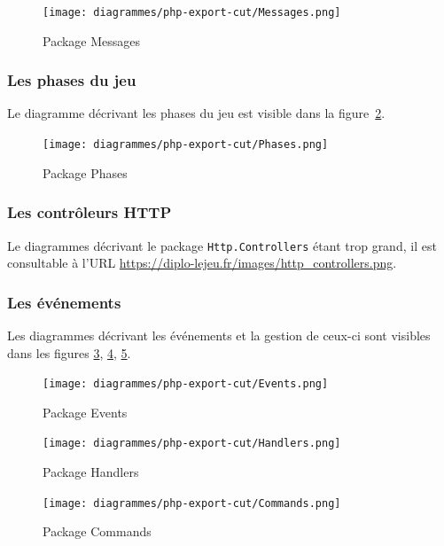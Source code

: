 			\begin{figure}[h!]
				\centering
                \texttt{[image: diagrammes/php-export-cut/Messages.png]}
                \caption{\label{pmessages}Package Messages}
                \pagebreak
			\end{figure}

        \subsubsection{Les phases du jeu}
        Le diagramme décrivant les phases du jeu est visible dans la figure~\ref{pphases}.

			\begin{figure}[H]
				\centering
                \texttt{[image: diagrammes/php-export-cut/Phases.png]}
                \caption{\label{pphases}Package Phases}
			\end{figure}

        \subsubsection{Les contrôleurs HTTP}
        Le diagrammes décrivant le package \verb|Http.Controllers| étant trop grand, il est consultable à l'URL \url{https://diplo-lejeu.fr/images/http\_controllers.png}.

        \subsubsection{Les événements}
        Les diagrammes décrivant les événements et la gestion de ceux-ci sont visibles dans les figures \ref{pevents}, \ref{phandlers}, \ref{pcommands}.

        	\begin{figure}[H]
				\centering
                \texttt{[image: diagrammes/php-export-cut/Events.png]}
                \caption{\label{pevents}Package Events}
			\end{figure}

			\begin{figure}[H]
				\centering
                \texttt{[image: diagrammes/php-export-cut/Handlers.png]}
                \caption{\label{phandlers}Package Handlers}
			\end{figure}

			\begin{figure}[H]
				\centering
                \texttt{[image: diagrammes/php-export-cut/Commands.png]}
                \caption{\label{pcommands}Package Commands}
			\end{figure}

